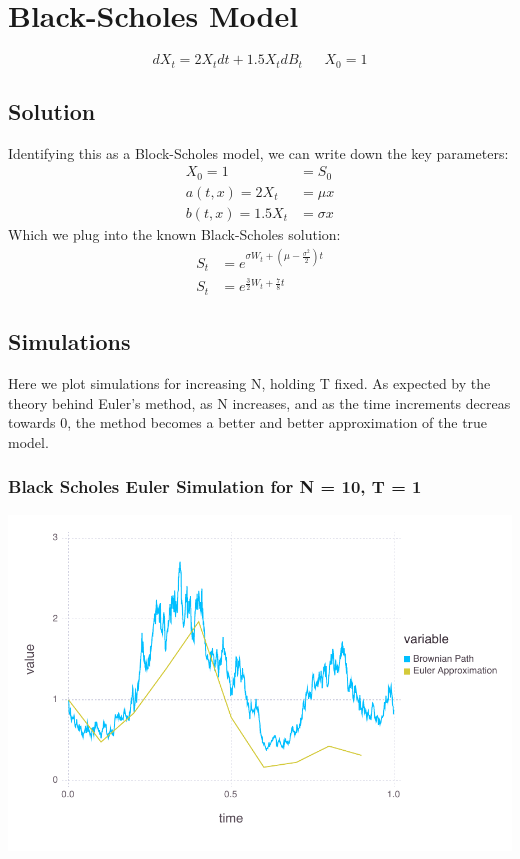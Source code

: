 \documentclass[a4paper,12pt]{article}
\begin{document}
\section{Black-Scholes Model}
$$
dX_t = 2X_tdt + 1.5X_tdB_t \ \ \ \ \ \ \ X_0 = 1
$$
%
\subsection*{Solution}
Identifying this as a Block-Scholes model, we can write down the key parameters:
\begin{align*}
X_0 = 1 &= S_0 \\
a(t, x) = 2X_t &= \mu x \\
b(t, x) = 1.5X_t &= \sigma x
\end{align*}
%
Which we plug into the known Black-Scholes solution:
%
\begin{align*}
S_t &= e^{\sigma W_t + (\mu - \frac{\sigma^2}{2})t} \\
S_t &= e^{\frac{3}{2}W_t + \frac{7}{8}t}
\end{align*}
\subsection*{Simulations}
Here we plot simulations for increasing N, holding T fixed. As expected by the theory behind Euler's method, as N increases, and as the time increments decreas towards 0, the method becomes a better and better approximation of the true model.
\subsubsection*{Black Scholes Euler Simulation for N = 10, T = 1}
\includegraphics[width=\linewidth]{figures/problemset_2_1.pdf}
\end{document}
